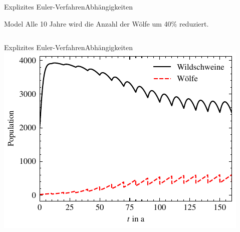 \documentclass[xelatex,aspectratio=169]{beamer}
\begin{document}
\begin{frame}{Explizites Euler-Verfahren}{Abhängigkeiten}
    \begin{block}{Model}
        Alle 10 Jahre wird die Anzahl der Wölfe um 40\% reduziert.
    \end{block}
    \inputminted[firstline=19 lastline=23]{python}{src/sim_dependency_c.py}
\end{frame}

\begin{frame}{Explizites Euler-Verfahren}{Abhängigkeiten}
    \centering
    \includegraphics[height=.8\textheight]{fig/sim_dependency_c.pdf}
\end{frame}
\end{document}
